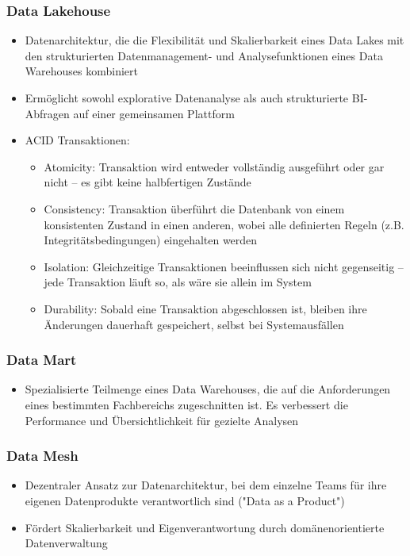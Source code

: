 \documentclass[11pt]{scrartcl}
\begin{document}
\subsubsection*{Data Lakehouse}
\begin{itemize}
	\item Datenarchitektur, die die Flexibilität und Skalierbarkeit eines Data Lakes mit den strukturierten Datenmanagement- und Analysefunktionen eines Data Warehouses kombiniert
	\item Ermöglicht sowohl explorative Datenanalyse als auch strukturierte BI-Abfragen auf einer gemeinsamen Plattform
	\item ACID Transaktionen:
	\begin{itemize}
		\item Atomicity: Transaktion wird entweder vollständig ausgeführt oder gar nicht – es gibt keine halbfertigen Zustände
		\item Consistency: Transaktion überführt die Datenbank von einem konsistenten Zustand in einen anderen, wobei alle definierten Regeln (z.B. Integritätsbedingungen) eingehalten werden
		\item Isolation: Gleichzeitige Transaktionen beeinflussen sich nicht gegenseitig – jede Transaktion läuft so, als wäre sie allein im System
		\item Durability: Sobald eine Transaktion abgeschlossen ist, bleiben ihre Änderungen dauerhaft gespeichert, selbst bei Systemausfällen
	\end{itemize}
\end{itemize}	

\subsubsection*{Data Mart}
\begin{itemize}
	\item Spezialisierte Teilmenge eines Data Warehouses, die auf die Anforderungen eines bestimmten Fachbereichs zugeschnitten ist. Es verbessert die Performance und Übersichtlichkeit für gezielte Analysen
\end{itemize}

\subsubsection*{Data Mesh}
\begin{itemize}
	\item Dezentraler Ansatz zur Datenarchitektur, bei dem einzelne Teams für ihre eigenen Datenprodukte verantwortlich sind ("Data as a Product")
	\item Fördert Skalierbarkeit und Eigenverantwortung durch domänenorientierte Datenverwaltung
\end{itemize}
\end{document}
